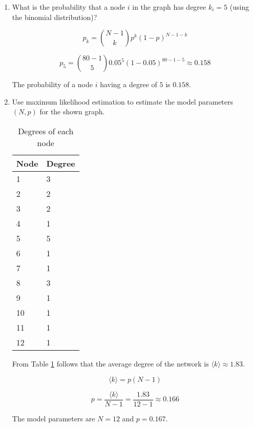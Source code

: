 \begin{enumerate}
	\item What is the probability that a node $i$ in the graph has degree $k_i = 5$ (using the binomial distribution)?
	
	\begin{equation}
	p_k = {N - 1 \choose k} p^k (1-p)^{N-1-k}
	\end{equation}
	
	\begin{equation}
	p_5 = {80 - 1 \choose 5} 0.05^5 (1-0.05)^{80-1-5} \approx 0.158
	\end{equation}
	
	The probability of a node $i$ having a degree of $5$ is $0.158$.
	
	\item Use maximum likelihood estimation to estimate the model parameters $(N, p)$ for the shown graph.
	
	\begin{table}[h]
		\centering
		\begin{tabular}{ll}
		\hline
		Node & Degree \\ \hline
		1    & 3      \\
		2    & 2      \\
		3    & 2      \\
		4    & 1      \\
		5    & 5      \\
		6    & 1      \\
		7    & 1      \\
		8    & 3      \\
		9    & 1      \\
		10   & 1      \\
		11   & 1      \\
		12   & 1      \\ \hline
		\end{tabular}
	\caption{Degrees of each node}
	\label{tab:node_degrees}
	\end{table}

	From Table \ref{tab:node_degrees} follows that the average degree of the network is $\langle k \rangle \approx 1.83$.
	
	\begin{equation}
	\langle k \rangle = p(N-1)
	\end{equation}
	
	\begin{equation}
	p = \frac{\langle k \rangle}{N-1} = \frac{1.83}{12-1} \approx 0.166
	\end{equation}
	
	The model parameters are $N = 12$ and $p = 0.167$.

\end{enumerate}
